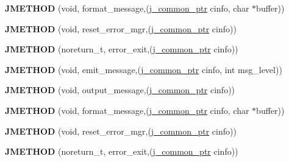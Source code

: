 \begin{DoxyCompactItemize}
\mbox{\label{structjpeg__error__mgr_a5f1dfb51c337c36ae1bc5fae7f84528f}} 
{\bfseries J\+M\+E\+T\+H\+OD} (void, format\+\_\+message,(\hyperlink{structjpeg__common__struct}{j\+\_\+common\+\_\+ptr} cinfo, char $\ast$buffer))
\item 
\mbox{\label{structjpeg__error__mgr_ac676478083167b3731995d7901bd4b6c}} 
{\bfseries J\+M\+E\+T\+H\+OD} (void, reset\+\_\+error\+\_\+mgr,(\hyperlink{structjpeg__common__struct}{j\+\_\+common\+\_\+ptr} cinfo))
\item 
\mbox{\label{structjpeg__error__mgr_a72c40bceda2e6cb78046165e6892ac3a}} 
{\bfseries J\+M\+E\+T\+H\+OD} (noreturn\+\_\+t, error\+\_\+exit,(\hyperlink{structjpeg__common__struct}{j\+\_\+common\+\_\+ptr} cinfo))
\item 
\mbox{\label{structjpeg__error__mgr_a73c0a027b6e6cb8ff2b7b0fc42f756f9}} 
{\bfseries J\+M\+E\+T\+H\+OD} (void, emit\+\_\+message,(\hyperlink{structjpeg__common__struct}{j\+\_\+common\+\_\+ptr} cinfo, int msg\+\_\+level))
\item 
\mbox{\label{structjpeg__error__mgr_ac2989f8ef34acdd78ce26a9110a1c094}} 
{\bfseries J\+M\+E\+T\+H\+OD} (void, output\+\_\+message,(\hyperlink{structjpeg__common__struct}{j\+\_\+common\+\_\+ptr} cinfo))
\item 
\mbox{\label{structjpeg__error__mgr_a5f1dfb51c337c36ae1bc5fae7f84528f}} 
{\bfseries J\+M\+E\+T\+H\+OD} (void, format\+\_\+message,(\hyperlink{structjpeg__common__struct}{j\+\_\+common\+\_\+ptr} cinfo, char $\ast$buffer))
\item 
\mbox{\label{structjpeg__error__mgr_ac676478083167b3731995d7901bd4b6c}} 
{\bfseries J\+M\+E\+T\+H\+OD} (void, reset\+\_\+error\+\_\+mgr,(\hyperlink{structjpeg__common__struct}{j\+\_\+common\+\_\+ptr} cinfo))
\item 
\mbox{\label{structjpeg__error__mgr_a72c40bceda2e6cb78046165e6892ac3a}} 
{\bfseries J\+M\+E\+T\+H\+OD} (noreturn\+\_\+t, error\+\_\+exit,(\hyperlink{structjpeg__common__struct}{j\+\_\+common\+\_\+ptr} cinfo))
\item 

\end{DoxyCompactItemize}
